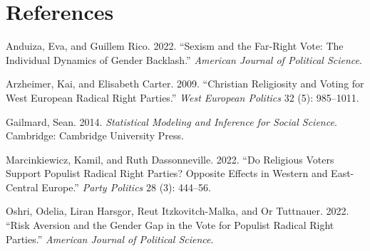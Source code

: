 \documentclass[
]{article}
\newlength{\cslhangindent}
\newlength{\cslentryspacingunit} %
\newenvironment{CSLReferences}[2] %
 {%
  \setlength{\parindent}{0pt}
  \ifodd #1
  \let\oldpar\par
  \def\par{\hangindent=\cslhangindent\oldpar}
  \fi
  \setlength{\parskip}{#2\cslentryspacingunit}
 }%
 {}
\begin{document}
\FloatBarrier

\hypertarget{references}{%
\section*{References}\label{references}}

\hypertarget{refs}{}
\begin{CSLReferences}{1}{0}
\leavevmode{}%
Anduiza, Eva, and Guillem Rico. 2022. {``Sexism and the Far-Right Vote:
The Individual Dynamics of Gender Backlash.''} \emph{American Journal of
Political Science}.

\leavevmode{}%
Arzheimer, Kai, and Elisabeth Carter. 2009. {``Christian Religiosity and
Voting for West European Radical Right Parties.''} \emph{West European
Politics} 32 (5): 985--1011.

\leavevmode{}%
Gailmard, Sean. 2014. \emph{Statistical {Modeling} and {Inference} for
{Social} {Science}}. Cambridge: Cambridge University Press.

\leavevmode{}%
Marcinkiewicz, Kamil, and Ruth Dassonneville. 2022. {``Do Religious
Voters Support Populist Radical Right Parties? Opposite Effects in
Western and East-Central Europe.''} \emph{Party Politics} 28 (3):
444--56.

\leavevmode{}%
Oshri, Odelia, Liran Harsgor, Reut Itzkovitch-Malka, and Or Tuttnauer.
2022. {``Risk Aversion and the Gender Gap in the Vote for Populist
Radical Right Parties.''} \emph{American Journal of Political Science}.

\end{CSLReferences}
\end{document}
